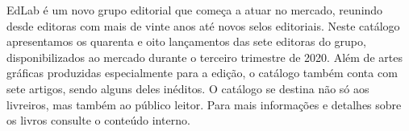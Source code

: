 \blankpage
\pagestyle{indice}

{}

\vspace{1.2cm}

{}


\hspace*{-7cm}\hrulefill\hspace*{-7cm}

\vspace{1cm}

\hspace*{-.5cm}\parbox{180pt}{\raggedright EdLab é um novo grupo editorial que começa a atuar no mercado, reunindo desde editoras com mais de vinte anos até novos selos editoriais. Neste catálogo apresentamos os quarenta e oito lançamentos das sete editoras do grupo, disponibilizados ao mercado durante o terceiro trimestre de 2020. Além de artes gráficas produzidas especialmente para a edição, o catálogo também conta com sete artigos, sendo alguns deles inéditos. O catálogo se destina não só aos livreiros, mas também ao público leitor. Para mais informações e detalhes sobre os livros consulte o conteúdo interno. } %

